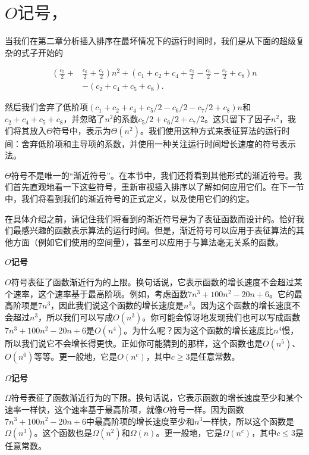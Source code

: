 \documentclass[lang=cn,newtx,10pt,scheme=chinese]{elegantbook}
\begin{document}
\section{\texorpdfstring{$O\text{记号，}$}\texorpdfstring{$\Omega\text{记号和}$}\texorpdfstring{$\Theta\text{记号}$}.}

当我们在第二章分析插入排序在最坏情况下的运行时间时，我们是从下面的超级复杂的式子开始的

\begin{equation*}
\begin{aligned}
\left(\frac{c_5}{2}+\right. & \left.\frac{c_6}{2}+\frac{c_7}{2}\right) n^2+\left(c_1+c_2+c_4+\frac{c_5}{2}-\frac{c_6}{2}-\frac{c_7}{2}+c_8\right) n \\
& -\left(c_2+c_4+c_5+c_8\right) .
\end{aligned}
\end{equation*}

然后我们舍弃了低阶项$\left(c_1+c_2+c_4+c_5 / 2-c_6 / 2-c_7 / 2+c_8\right) n$和$c_2+c_4+c_5+c_8$，并忽略了$n^2$的系数$c_5 / 2+c_6 / 2+c_7 / 2$。这只留下了因子$n^2$，我们将其放入$\Theta$符号中，表示为$\Theta(n^2)$。我们使用这种方式来表征算法的运行时间：舍弃低阶项和主导项的系数，并使用一种关注运行时间增长速度的符号表示法。

$\Theta$符号不是唯一的“渐近符号”。在本节中，我们还将看到其他形式的渐近符号。我们首先直观地看一下这些符号，重新审视插入排序以了解如何应用它们。在下一节中，我们将看到我们的渐近符号的正式定义，以及使用它们的约定。

在具体介绍之前，请记住我们将看到的渐近符号是为了表征函数而设计的。恰好我们最感兴趣的函数表示算法的运行时间。但是，渐近符号可以应用于表征算法的其他方面（例如它们使用的空间量），甚至可以应用于与算法毫无关系的函数。

\textbf{$O$记号}

$O$符号表征了函数渐近行为的上限。换句话说，它表示函数的增长速度不会超过某个速率，这个速率基于最高阶项。例如，考虑函数$7 n^3+100 n^2-20 n+6$。它的最高阶项是$7n^3$，因此我们说这个函数的增长速度是$n^3$。因为这个函数的增长速度不会超过$n^3$，所以我们可以写成$O(n^3)$。你可能会惊讶地发现我们也可以写成函数$7 n^3+100 n^2-20 n+6$是$O(n^4)$。为什么呢？因为这个函数的增长速度比$n^4$慢，所以我们说它不会增长得更快。正如你可能猜到的那样，这个函数也是$O(n^5)$、$O(n^6)$等等。更一般地，它是$O(n^c)$，其中$c \ge 3$是任意常数。

\textbf{$\Omega$记号}

$\Omega$符号表征了函数渐近行为的下限。换句话说，它表示函数的增长速度至少和某个速率一样快，这个速率基于最高阶项，就像$O$符号一样。因为函数$7 n^3+100 n^2-20 n+6$中最高阶项的增长速度至少和$n^3$一样快，所以这个函数是$\Omega\left(n^3\right)$。这个函数也是$\Omega\left(n^2\right)$和$\Omega(n)$。更一般地，它是$\Omega\left(n^c\right)$，其中$c \leq 3$是任意常数。
\end{document}
